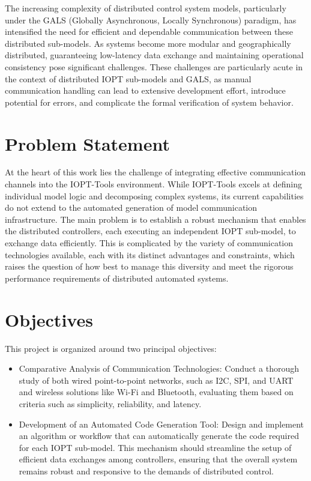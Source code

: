 The increasing complexity of distributed control system models, particularly under the GALS (Globally Asynchronous, Locally Synchronous) paradigm, has intensified the need for efficient and dependable communication between these distributed sub-models. As systems become more modular and geographically distributed, guaranteeing low-latency data exchange and maintaining operational consistency pose significant challenges. These challenges are particularly acute in the context of distributed IOPT sub-models and GALS, as manual communication handling can lead to extensive development effort, introduce potential for errors, and complicate the formal verification of system behavior.


\section{Problem Statement}
\label{sec:problem_statement}


At the heart of this work lies the challenge of integrating effective communication channels into the IOPT-Tools environment. While IOPT-Tools excels at defining individual model logic and decomposing complex systems, its current capabilities do not extend to the automated generation of model communication infrastructure. The main problem is to establish a robust mechanism that enables the distributed controllers, each executing an independent IOPT sub-model, to exchange data efficiently. This is complicated by the variety of communication technologies available, each with its distinct advantages and constraints, which raises the question of how best to manage this diversity and meet the rigorous performance requirements of distributed automated systems.

\section{Objectives}
\label{sec:objectives}

This project is organized around two principal objectives:

\begin{itemize}
    \item Comparative Analysis of Communication Technologies: Conduct a thorough study of both wired point-to-point networks, such as I2C, SPI, and UART and wireless solutions like Wi-Fi and Bluetooth, evaluating them based on criteria such as simplicity, reliability, and latency.
    \item Development of an Automated Code Generation Tool: Design and implement an algorithm or workflow that can automatically generate the code required for each IOPT sub-model. This mechanism should streamline the setup of efficient data exchanges among controllers, ensuring that the overall system remains robust and responsive to the demands of distributed control.
\end{itemize}

